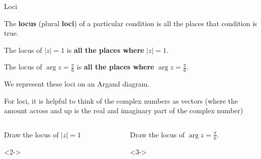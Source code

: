 \documentclass[8pt]{beamer}
\begin{document}
\begin{frame}[shrink=10]{Loci}
	\begin{definition}
		The \textbf{locus} (plural \textbf{loci}) of a particular condition is all the places that condition is true.  
	\end{definition}

	The locus of $|z|=1$ is  \textbf{all the places where} $|z|=1$.

	The locus of $\arg z =\frac{\pi}{6}$ is \textbf{all the places where} $\arg z = \frac{\pi}{6}$.

	We represent these loci on an Argand diagram.

	\alert{For loci, it is helpful to think of the complex numbers as vectors (where the amount across
and up is the real and imaginary part of the complex number)}

\begin{columns}[T]
\begin{column}{.5\linewidth}
\begin{problem}
	Draw the locus of $|z|=1$
\end{problem}
\begin{solution}<2->
	

	\begin{center}
\end{center}
\end{solution} 
\end{column}
\begin{column}{.5\linewidth}
	\begin{problem}
		Draw the locus of $\arg z=\frac{\pi}{6}$.
	\end{problem}
	\begin{solution}<3->
		

	\begin{center}
\end{center}
	\end{solution}
\end{column}
\end{columns}
\end{frame}
\end{document}

